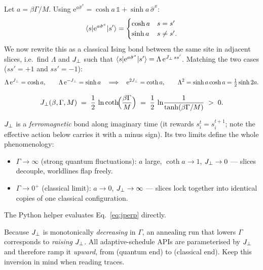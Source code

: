Let $a=\beta\Gamma/M$. Using
$\mathrm{e}^{a\hat\sigma^x}=\cosh a\,\mathbb 1+\sinh a\,\hat\sigma^x$:
\begin{equation}
\langle s\rvert\mathrm{e}^{a\hat\sigma^x}\lvert s'\rangle
=\begin{cases}
\cosh a & s=s'\\
\sinh a & s\ne s' .
\end{cases}
\end{equation}
We now rewrite this as a classical Ising bond between the same site in
adjacent slices, i.e.\ find $\Lambda$ and $J_{\perp}$ such that
$\langle s\rvert\mathrm{e}^{a\hat\sigma^x}\lvert s'\rangle=\Lambda\,\mathrm{e}^{J_{\perp}\,ss'}$.
Matching the two cases ($ss'=+1$ and $ss'=-1$):
\begin{equation}
\Lambda\,\mathrm{e}^{J_{\perp}}=\cosh a,\qquad
\Lambda\,\mathrm{e}^{-J_{\perp}}=\sinh a
\quad\Longrightarrow\quad
\mathrm{e}^{2J_{\perp}}=\coth a,\qquad
\Lambda^2=\sinh a\cosh a=\tfrac12\sinh 2a .
\end{equation}

\begin{keyeq}
\begin{equation}
J_{\perp}(\beta,\Gamma,M)\;=\;\frac12\,\ln\coth\!\Bigl(\frac{\beta\Gamma}{M}\Bigr)
\;=\;\frac12\,\ln\!\frac{1}{\tanh(\beta\Gamma/M)}\;>\;0 .
\label{eq:jperp}
\end{equation}
\end{keyeq}

$J_{\perp}$ is a \emph{ferromagnetic} bond along imaginary time (it rewards
$s^t_i=s^{t+1}_i$; note the effective action below carries it with a minus
sign). Its two limits define the whole phenomenology:
\begin{itemize}
\item $\Gamma\to\infty$ (strong quantum fluctuations): $a$ large,
$\coth a\to1$, $J_{\perp}\to0$ --- slices decouple, worldlines flap freely.
\item $\Gamma\to0^+$ (classical limit): $a\to0$, $J_{\perp}\to\infty$ --- slices
lock together into identical copies of one classical configuration.
\end{itemize}
The Python helper  evaluates Eq.~\eqref{eq:jperp} directly.

\begin{warnbox}
Because $J_{\perp}$ is monotonically \emph{decreasing} in $\Gamma$, an annealing
run that lowers $\Gamma$ corresponds to \emph{raising} $J_{\perp}$. All
\qv{} adaptive-schedule APIs are parameterised by $J_{\perp}$ and therefore ramp it
\emph{upward}, from  (quantum end) to
 (classical end). Keep this inversion in mind when reading
traces.
\end{warnbox}

